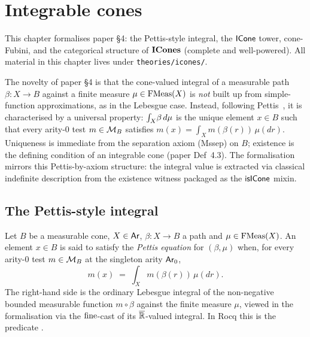 %

\chapter{Integrable cones}\label{ch:icones}

This chapter formalises paper \S4: the Pettis-style integral, the
$\mathsf{ICone}$ \HB{} tower, cone-Fubini, and the categorical structure of
$\mathbf{ICones}$ (complete and well-powered). All material in this chapter
lives under \texttt{theories/icones/}.

The novelty of paper \S4 is that the cone-valued integral of a
measurable path $\beta : X \to B$ against a finite measure
$\mu \in \mathrm{FMeas}(X)$ is \emph{not} built up from simple-function
approximations, as in the Lebesgue case. Instead, following
Pettis~\cite{Pet38}, it is characterised by a universal property:
$\int_{X}\!\beta\,d\mu$ is the unique element $x \in B$ such that
every arity-$0$ test $m \in \mathcal{M}_B$ satisfies
$m(x) = \int_X m(\beta(r))\,\mu(dr)$. Uniqueness is immediate from
the separation axiom (Mssep) on $B$; existence is the defining
condition of an integrable cone (paper Def~4.3). The formalisation
mirrors this Pettis-by-axiom structure: the integral value is
extracted via classical indefinite description from the existence
witness packaged as the $\mathsf{isICone}$ \HB{} mixin.

\section{The Pettis-style integral}\label{sec:pettis}

\begin{definition}\label{def:path-integral-eq}
Let $B$ be a measurable cone, $X \in \mathsf{Ar}$, $\beta : X \to B$ a path
and $\mu \in \mathrm{FMeas}(X)$. An element $x \in B$ is said to satisfy the
\emph{Pettis equation} for $(\beta, \mu)$ when, for every arity-$0$
test $m \in \mathcal{M}_B$ at the singleton arity $\mathsf{Ar}_0$,
\[
  m(x) \;=\; \int_X m(\beta(r))\,\mu(dr).
\]
The right-hand side is the ordinary Lebesgue integral of the
non-negative bounded measurable function $m \circ \beta$ against the
finite measure $\mu$, viewed in the formalisation via the
$\mathrm{fine}$-cast of its $\overline{\mathbb{R}}$-valued integral. In Rocq this is
the predicate .
\rocqok
\end{definition}

